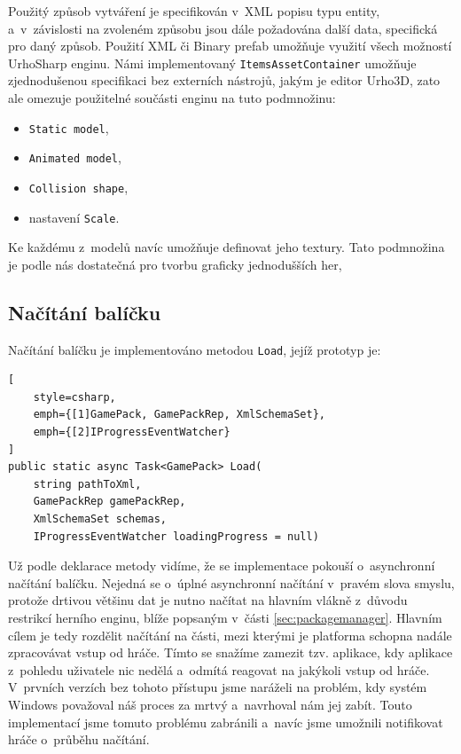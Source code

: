 Použitý způsob vytváření je specifikován v~XML popisu typu entity, a~v~závislosti na zvoleném způsobu jsou dále požadována další data, specifická pro daný způsob. Použití XML či Binary prefab umožňuje využití všech možností UrhoSharp enginu. Námi implementovaný \texttt{ItemsAssetContainer} umožňuje zjednodušenou specifikaci bez externích nástrojů, jakým je editor Urho3D, zato ale omezuje použitelné součásti enginu na tuto podmnožinu:

\begin{itemize}
	\item \texttt{Static model},
	\item \texttt{Animated model},
	\item \texttt{Collision shape},
	\item nastavení \texttt{Scale}.
\end{itemize}

Ke každému z~modelů navíc umožňuje definovat jeho textury. Tato podmnožina je podle nás dostatečná pro tvorbu graficky jednodušších her,

\subsection{Načítání balíčku}
\label{sec:packageloading}

Načítání balíčku je implementováno metodou \texttt{Load}, jejíž prototyp je:

\begin{lstlisting}[
	style=csharp,
	emph={[1]GamePack, GamePackRep, XmlSchemaSet}, 
	emph={[2]IProgressEventWatcher}
]
public static async Task<GamePack> Load(
	string pathToXml,
	GamePackRep gamePackRep,
	XmlSchemaSet schemas,
	IProgressEventWatcher loadingProgress = null)
\end{lstlisting}

Už podle deklarace metody vidíme, že se implementace pokouší o~asynchronní načítání balíčku. Nejedná se o~úplné asynchronní načítání v~pravém slova smyslu, protože drtivou většinu dat je nutno načítat na hlavním vlákně z~důvodu restrikcí herního enginu, blíže popsaným v~části \ref{sec:packagemanager}. Hlavním cílem je tedy rozdělit načítání na části, mezi kterými je platforma schopna nadále zpracovávat vstup od hráče. Tímto se snažíme zamezit tzv.  aplikace, kdy aplikace z~pohledu uživatele nic nedělá a~odmítá reagovat na jakýkoli vstup od hráče. V~prvních verzích bez tohoto přístupu jsme naráželi na problém, kdy systém Windows považoval náš proces za mrtvý a~navrhoval nám jej zabít. Touto implementací jsme tomuto problému zabránili a~navíc jsme umožnili notifikovat hráče o~průběhu načítání.

